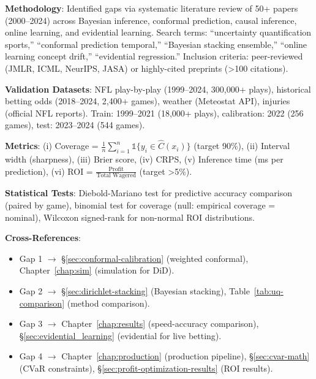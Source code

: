 \begin{landscape}
\begin{table}[p]
\begin{threeparttable}
  \begin{tablenotes}[flushleft]
    \scriptsize
    \item \textbf{Methodology}: Identified gaps via systematic literature review of 50+ papers (2000--2024) across Bayesian inference, conformal prediction, causal inference, online learning, and evidential learning. Search terms: ``uncertainty quantification sports,'' ``conformal prediction temporal,'' ``Bayesian stacking ensemble,'' ``online learning concept drift,'' ``evidential regression.'' Inclusion criteria: peer-reviewed (JMLR, ICML, NeurIPS, JASA) or highly-cited preprints (>100 citations).
    \item \textbf{Validation Datasets}: NFL play-by-play (1999--2024, 300,000+ plays), historical betting odds (2018--2024, 2,400+ games), weather (Meteostat API), injuries (official NFL reports). Train: 1999--2021 (18,000+ plays), calibration: 2022 (256 games), test: 2023--2024 (544 games).
    \item \textbf{Metrics}: (i) Coverage = $\frac{1}{n}\sum_{i=1}^n \mathbb{1}\{y_i \in \hat{C}(x_i)\}$ (target 90\%), (ii) Interval width (sharpness), (iii) Brier score, (iv) CRPS, (v) Inference time (ms per prediction), (vi) ROI = $\frac{\text{Profit}}{\text{Total Wagered}}$ (target >5\%).
    \item \textbf{Statistical Tests}: Diebold-Mariano test for predictive accuracy comparison (paired by game), binomial test for coverage (null: empirical coverage = nominal), Wilcoxon signed-rank for non-normal ROI distributions.
    \item \textbf{Cross-References}:
      \begin{itemize}[leftmargin=*, itemsep=0pt, parsep=0pt]
        \item Gap 1 $\to$ \S\ref{sec:conformal-calibration} (weighted conformal), Chapter~\ref{chap:sim} (simulation for DiD).
        \item Gap 2 $\to$ \S\ref{sec:dirichlet-stacking} (Bayesian stacking), Table~\ref{tab:uq-comparison} (method comparison).
        \item Gap 3 $\to$ Chapter~\ref{chap:results} (speed-accuracy comparison), \S\ref{sec:evidential_learning} (evidential for live betting).
        \item Gap 4 $\to$ Chapter~\ref{chap:production} (production pipeline), \S\ref{sec:cvar-math} (CVaR constraints), \S\ref{sec:profit-optimization-results} (ROI results).
      \end{itemize}
  \end{tablenotes}
  \end{threeparttable}
\end{table}
\end{landscape}

